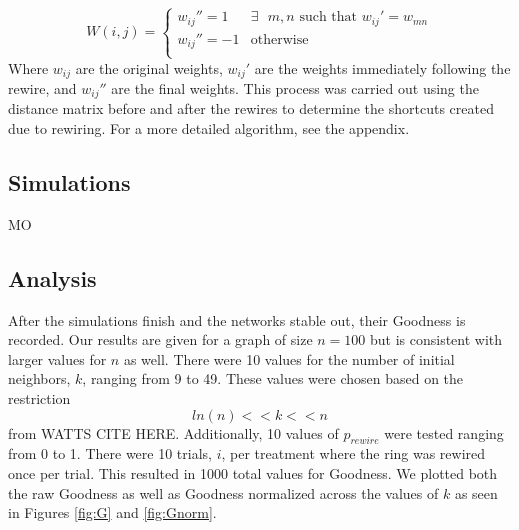 \documentclass{article}
\begin{document}
\[ W(i,j) =    \left\{
\begin{array}{ll}
      w_{ij}'' = 1 & \exists \text{ } m,n \text{ such that } w_{ij}' = w_{mn} \\
      w_{ij}'' = -1 & \text{otherwise} \\
\end{array} 
\right. \]
 Where $w_{ij}$ are the original weights, $w_{ij}'$ are the weights immediately following the rewire, and $w_{ij}''$ are the final weights. This process was carried out using the distance matrix before and after the rewires to determine the shortcuts created due to rewiring. For a more detailed algorithm, see the appendix.




\subsection{Simulations}
MO

\subsection{Analysis}
After the simulations finish and the networks stable out, their Goodness is recorded. Our results are given for a graph of size $n = 100$ but is consistent with larger values for $n$ as well. There were 10 values for the number of initial neighbors, $k$, ranging from 9 to 49. These values were chosen based on the restriction $$ln(n) << k << n$$ from WATTS CITE HERE. Additionally, 10 values of $p_{rewire}$ were tested ranging from 0 to 1. There were 10 trials, $i$, per treatment where the ring was rewired once per trial. This resulted in 1000 total values for Goodness. We plotted both the raw Goodness as well as Goodness normalized across the values of $k$ as seen in Figures \ref{fig:G}  and \ref{fig:Gnorm}. 
\end{document}
